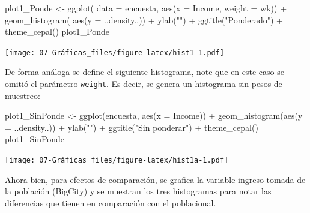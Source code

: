 \documentclass[
  12pt,
]{book}
\newenvironment{Shaded}{\begin{snugshade}}{\end{snugshade}}
\newcommand{\AttributeTok}[1]{\textcolor[rgb]{0.77,0.63,0.00}{#1}}
\newcommand{\FunctionTok}[1]{\textcolor[rgb]{0.00,0.00,0.00}{#1}}
\newcommand{\NormalTok}[1]{#1}
\newcommand{\OtherTok}[1]{\textcolor[rgb]{0.56,0.35,0.01}{#1}}
\newcommand{\SpecialCharTok}[1]{\textcolor[rgb]{0.00,0.00,0.00}{#1}}
\newcommand{\StringTok}[1]{\textcolor[rgb]{0.31,0.60,0.02}{#1}}
\begin{document}
\begin{Shaded}
\begin{Highlighting}[]
\NormalTok{plot1\_Ponde }\OtherTok{\textless{}{-}} \FunctionTok{ggplot}\NormalTok{(}
  \AttributeTok{data =}\NormalTok{ encuesta,              }
  \FunctionTok{aes}\NormalTok{(}\AttributeTok{x =}\NormalTok{ Income, }\AttributeTok{weight =}\NormalTok{ wk)) }\SpecialCharTok{+}
  \FunctionTok{geom\_histogram}\NormalTok{(               }
    \FunctionTok{aes}\NormalTok{(}\AttributeTok{y =}\NormalTok{ ..density..)) }\SpecialCharTok{+}        
  \FunctionTok{ylab}\NormalTok{(}\StringTok{""}\NormalTok{) }\SpecialCharTok{+}                   
  \FunctionTok{ggtitle}\NormalTok{(}\StringTok{"Ponderado"}\NormalTok{) }\SpecialCharTok{+}        
  \FunctionTok{theme\_cepal}\NormalTok{()  }
\NormalTok{plot1\_Ponde}
\end{Highlighting}
\end{Shaded}

\texttt{[image: 07-Gráficas\_files/figure-latex/hist1-1.pdf]}

De forma análoga se define el siguiente histograma, note que en este caso se omitió el parámetro \texttt{weight}. Es decir, se genera un histograma sin pesos de muestreo:

\begin{Shaded}
\begin{Highlighting}[]
\NormalTok{plot1\_SinPonde }\OtherTok{\textless{}{-}}
  \FunctionTok{ggplot}\NormalTok{(encuesta, }\FunctionTok{aes}\NormalTok{(}\AttributeTok{x =}\NormalTok{ Income)) }\SpecialCharTok{+}
  \FunctionTok{geom\_histogram}\NormalTok{(}\FunctionTok{aes}\NormalTok{(}\AttributeTok{y =}\NormalTok{ ..density..)) }\SpecialCharTok{+}
  \FunctionTok{ylab}\NormalTok{(}\StringTok{""}\NormalTok{) }\SpecialCharTok{+}
  \FunctionTok{ggtitle}\NormalTok{(}\StringTok{"Sin ponderar"}\NormalTok{) }\SpecialCharTok{+}
  \FunctionTok{theme\_cepal}\NormalTok{()}
\NormalTok{plot1\_SinPonde}
\end{Highlighting}
\end{Shaded}

\texttt{[image: 07-Gráficas\_files/figure-latex/hist1a-1.pdf]}

Ahora bien, para efectos de comparación, se grafica la variable ingreso tomada de la población (BigCity) y se muestran los tres histogramas para notar las diferencias que tienen en comparación con el poblacional.
\end{document}
